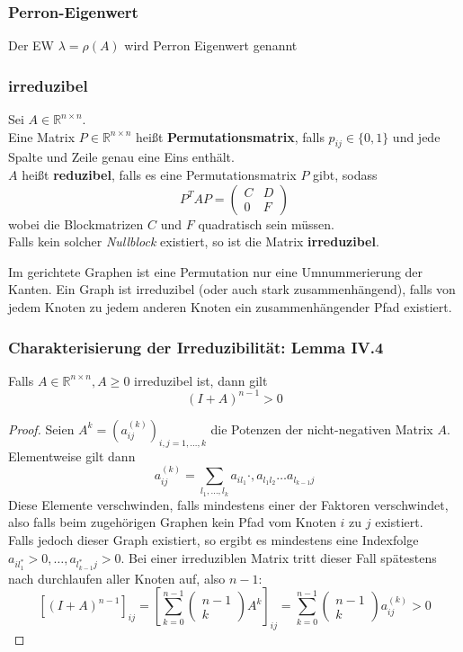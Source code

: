 \documentclass[]{article}
\begin{document}
\subsubsection*{Perron-Eigenwert}
Der EW $\lambda = \rho(A)$ wird Perron Eigenwert genannt

\subsubsection*{irreduzibel}
Sei $A \in \mathbb{R}^{n \times n}$. \\
Eine Matrix $P \in \mathbb{R}^{n \times n}$ heißt \textbf{Permutationsmatrix}, falls $p_{ij} \in \{0,1\}$ und jede Spalte und Zeile genau eine Eins enthält. \\
$A$ heißt \textbf{reduzibel}, falls es eine Permutationsmatrix $P$ gibt, sodass
\[ P^T A P = 
\begin{pmatrix}
C & D \\
0 & F 
\end{pmatrix}  \]
wobei die Blockmatrizen $C$ und $F$ quadratisch sein müssen. \\
Falls kein solcher \textit{Nullblock} existiert, so ist die Matrix \textbf{irreduzibel}.

Im gerichtete Graphen ist eine Permutation nur eine Umnummerierung der Kanten. Ein Graph ist irreduzibel (oder auch stark zusammenhängend), falls von jedem Knoten zu jedem anderen Knoten ein zusammenhängender Pfad existiert. 

\subsubsection*{Charakterisierung der Irreduzibilität: Lemma IV.4}
Falls $A \in \mathbb{R}^{n \times n}, A \geq 0$ irreduzibel ist, dann gilt
\[ (I + A)^{n-1} > 0 \]
\begin{proof}
	Seien $A^k = (a_{ij}^{(k)} )_{i,j = 1, \dotsc, k}$ die Potenzen der nicht-negativen Matrix $A$. Elementweise gilt dann
	\begin{equation*}
	a_{ij}^{(k)} = \sum_{l_1, \dotsc, l_k} a_{i l_1} \cdot, a_{l_1 l_2} \dots a_{l_{k-1} j}
	\end{equation*}
	Diese Elemente verschwinden, falls mindestens einer der Faktoren verschwindet, also falls beim zugehörigen Graphen kein Pfad vom Knoten $i$ zu $j$ existiert. \\
	Falls jedoch dieser Graph existiert, so ergibt es mindestens eine Indexfolge $a_{i l^*_1} >0, \dotsc, a_{l^*_{k-1} j} >0$. Bei einer irreduziblen Matrix tritt dieser Fall spätestens nach durchlaufen aller Knoten auf, also $n-1$:
	\begin{equation*}
	\left[ (I + A)^{n-1} \right]_{ij} = \left[ \sum_{k=0}^{n-1} \begin{pmatrix} n-1 \\ k \end{pmatrix} A^k \right]_{ij} = \sum_{k=0}^{n-1} \begin{pmatrix} n-1 \\ k \end{pmatrix} a_{ij}^{(k)} > 0
	\end{equation*}
	\end{proof}
\end{document}
